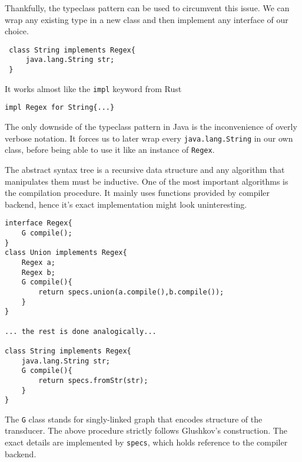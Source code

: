  Thankfully, the typeclass pattern can be used to circumvent this issue.
 We can wrap any existing type in a new class and then implement any
 interface of our choice.
 \begin{lstlisting}
 class String implements Regex{
     java.lang.String str;
 }
 \end{lstlisting}
It works almost like the \texttt{impl} keyword from Rust
 \begin{lstlisting}
impl Regex for String{...}
\end{lstlisting}
The only downside of the typeclass pattern in Java is the inconvenience of overly verbose notation. It forces us to later wrap every 
\texttt{java.lang.String} in our own class, before being able to use it like an instance of \texttt{Regex}.

The abstract syntax tree is a recursive data structure and any algorithm that manipulates them must be inductive. One of the most important  algorithms is the compilation procedure. It mainly uses functions provided by compiler backend, hence it's exact implementation might look uninteresting. 
\begin{lstlisting}
interface Regex{
    G compile();
}
class Union implements Regex{
    Regex a; 
    Regex b;
    G compile(){
        return specs.union(a.compile(),b.compile());
    }
}

... the rest is done analogically...

class String implements Regex{
    java.lang.String str;
    G compile(){
        return specs.fromStr(str);
    }
}
\end{lstlisting}
The \texttt{G} class stands for singly-linked graph that encodes structure of the transducer. The above procedure strictly follows Glushkov's construction.
The exact details are implemented by \texttt{specs}, which holds reference to the compiler backend. 

